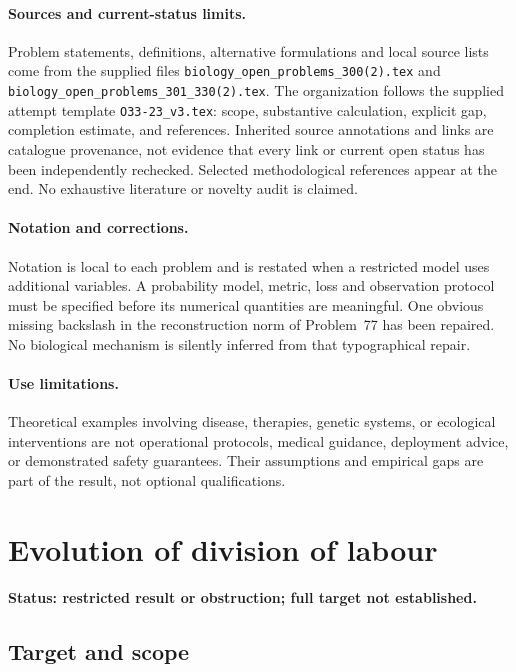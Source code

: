 \documentclass[11pt]{article}
\begin{document}
\paragraph{Sources and current-status limits.}
Problem statements, definitions, alternative formulations and local source lists
come from the supplied files
\texttt{biology\_open\_problems\_300(2).tex} and
\texttt{biology\_open\_problems\_301\_330(2).tex}.
The organization follows the supplied attempt template
\texttt{O33-23\_v3.tex}: scope, substantive calculation, explicit gap,
completion estimate, and references. Inherited source annotations and links are
catalogue provenance, not evidence that every link or current open status has
been independently rechecked. Selected methodological references appear at the
end. No exhaustive literature or novelty audit is claimed.

\paragraph{Notation and corrections.}
Notation is local to each problem and is restated when a restricted model uses
additional variables. A probability model, metric, loss and observation protocol
must be specified before its numerical quantities are meaningful. One obvious
missing backslash in the reconstruction norm of Problem~77 has been repaired.
No biological mechanism is silently inferred from that typographical repair.

\paragraph{Use limitations.}
Theoretical examples involving disease, therapies, genetic systems, or ecological
interventions are not operational protocols, medical guidance, deployment advice,
or demonstrated safety guarantees. Their assumptions and empirical gaps are part
of the result, not optional qualifications.


\section*{Evolution of division of labour}
\label{prob:152}
\noindent\textbf{Status: restricted result or obstruction; full target not established.}
\subsection{Target and scope}
\end{document}
